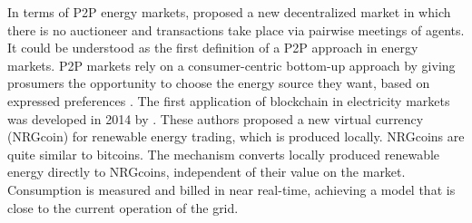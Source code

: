 In terms of P2P energy markets, \cite{blouin2001decentralized} proposed a new decentralized market in which there is no auctioneer and transactions take place via pairwise meetings of agents. It could be understood as the first definition of a P2P approach in energy markets. P2P markets rely on a consumer-centric bottom-up approach by giving prosumers the opportunity to choose the energy source they want, based on expressed preferences \cite{sousa2018peer}. The first application of blockchain in electricity markets was developed in 2014 by \cite{mihaylov2014nrgcoin}. These authors proposed a new virtual currency (NRGcoin) for renewable energy trading, which is produced locally. NRGcoins are quite similar to bitcoins. The mechanism converts locally produced renewable energy directly to NRGcoins, independent of their value on the market. Consumption is measured and billed in near real-time, achieving a model that is close to the current operation of the grid.

